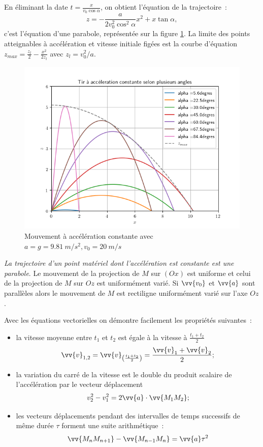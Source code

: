 En éliminant la date $t=\frac{x}{v_0\cos\alpha}$, on obtient l'équation de la trajectoire~:
\begin{equation}
  z = -\frac{a}{2v_0^2\cos^2\alpha}x^2+x\tan\alpha,
\end{equation}
c'est l'équation d'une parabole, représentée sur la figure \ref{fig:acceleration_constante}. La limite des points atteignables à accélération et vitesse initiale figées est la courbe d'équation $z_{max} = \frac{z_l}{2} - \frac{x^2}{2 z_l}$ avec $z_l = v_0^2/a$.

\begin{figure}
	\centering
	\includegraphics[width=0.8\linewidth]{acceleration_constante}
	\caption{Mouvement à accélération constante avec $a = g = \SI{9,81}{m/s^2}, v_0=\SI{20}{m/s}$}
	\label{fig:acceleration_constante}
\end{figure}

\emph{La trajectoire d'un point matériel dont l'accélération est constante est une parabole}. Le mouvement de la projection de $M$ sur $(Ox)$ est uniforme et celui de la projection de $M$ sur $Oz$ est uniformément varié. Si $\vv{v_0}$ et $\vv{a}$ sont parallèles alors le mouvement de $M$ est rectiligne uniformément varié sur l'axe $Oz$.

Avec les équations vectorielles on démontre facilement les propriétés suivantes~:
\begin{itemize}
\item la vitesse moyenne entre $t_1$ et $t_2$ est égale à la vitesse à $\frac{t_1+t_2}{2}$
  \begin{equation}
    \vv{v}_{1,2}=\vv{v}_{\left(\frac{t_1+t_2}{2}\right)}=\frac{\vv{v}_1+\vv{v}_2}{2};
  \end{equation}
\item la variation du carré de la vitesse est le double du produit scalaire de l'accélération par le vecteur déplacement
  \begin{equation}
v_2^2-v_1^2=2\vv{a}\cdot \vv{M_1M_2};
  \end{equation}
\item les vecteurs déplacements pendant des intervalles de temps successifs de même durée $\tau$ forment une suite arithmétique~:
  \begin{equation}
    \vv{M_nM_{n+1}}-\vv{M_{n-1}M_{n}}=\vv{a}\tau^2
  \end{equation}
\end{itemize}

